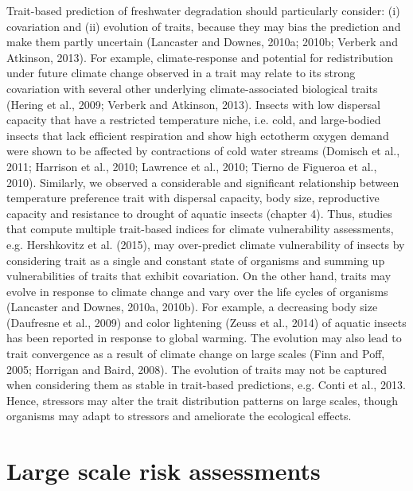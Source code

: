 Trait-based prediction of freshwater degradation should particularly consider: (i) covariation and (ii) evolution of traits, because they may bias the prediction and make them partly uncertain (Lancaster and Downes, 2010a; 2010b; Verberk and Atkinson, 2013). For example, climate-response and potential for redistribution under future climate change observed in a trait may relate to its strong covariation with several other underlying climate-associated biological traits (Hering et al., 2009; Verberk and Atkinson, 2013). Insects with low dispersal capacity that have a restricted temperature niche, i.e. cold, and large-bodied insects that lack efficient respiration and show high ectotherm oxygen demand were shown to be affected by contractions of cold water streams (Domisch et al., 2011; Harrison et al., 2010; Lawrence et al., 2010; Tierno de Figueroa et al., 2010). Similarly, we observed a considerable and significant relationship between temperature preference trait with dispersal capacity, body size, reproductive capacity and resistance to drought of aquatic insects (chapter 4). Thus, studies that compute multiple trait-based indices for climate vulnerability assessments, e.g. Hershkovitz et al. (2015), may over-predict climate vulnerability of insects by considering trait as a single and constant state of organisms and summing up vulnerabilities of traits that exhibit covariation. On the other hand, traits may evolve in response to climate change and vary over the life cycles of organisms (Lancaster and Downes, 2010a, 2010b). For example, a decreasing body size (Daufresne et al., 2009) and color lightening (Zeuss et al., 2014) of aquatic insects has been reported in response to global warming. The evolution may also lead to trait convergence as a result of climate change on large scales (Finn and Poff, 2005; Horrigan and Baird, 2008). The evolution of traits may not be captured when considering them as stable in trait-based predictions, e.g. Conti et al., 2013. Hence, stressors may alter the trait distribution patterns on large scales, though organisms may adapt to stressors and ameliorate the ecological effects.

\section{Large scale risk assessments}
\label{Large scale risk assessments}

